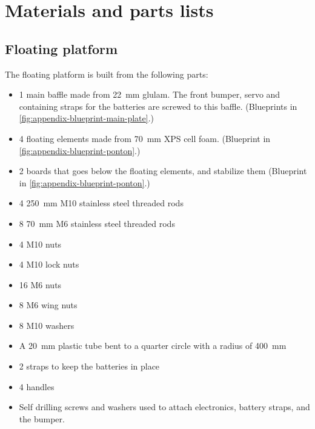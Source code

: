 \section{Materials and parts lists}\label{sec:appendix-a}

\subsection{Floating platform}

The floating platform is built from the following parts:

\begin{itemize}
  \item 1 main baffle made from 22~mm glulam. The front bumper,
    servo and containing straps for the batteries are screwed to this baffle. (Blueprints in \cref{fig:appendix-blueprint-main-plate}.)
  \item 4 floating elements made from 70~mm XPS cell foam. (Blueprint in \cref{fig:appendix-blueprint-ponton}.)
  \item 2 boards that goes below the floating elements, and stabilize them (Blueprint in \cref{fig:appendix-blueprint-ponton}.)
  \item 4 250~mm M10 stainless steel threaded rods
  \item 8 70~mm M6 stainless steel threaded rods
  \item 4 M10 nuts
  \item 4 M10 lock nuts
  \item 16 M6 nuts
  \item 8 M6 wing nuts
  \item 8 M10 washers
  \item A 20~mm plastic tube bent to a quarter circle with a radius of 400~mm
  \item 2 straps to keep the batteries in place
  \item 4 handles
  \item Self drilling screws and washers used to attach electronics, battery
    straps, and the bumper.
\end{itemize}

